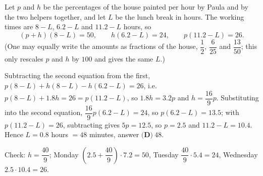 Let $p$ and $h$ be the percentages of the house painted per hour by Paula and by the two helpers together, and let $L$ be the lunch break in hours. The working times are $8-L$, $6.2-L$ and $11.2-L$ hours, so
\[
(p+h)(8-L)=50,\qquad h(6.2-L)=24,\qquad p(11.2-L)=26 .
\]
(One may equally write the amounts as fractions of the house, $\dfrac{1}{2}$, $\dfrac{6}{25}$ and $\dfrac{13}{50}$; this only rescales $p$ and $h$ by $100$ and gives the same $L$.)

Subtracting the second equation from the first, $p(8-L)+h(8-L)-h(6.2-L)=26$, i.e.\ $p(8-L)+1.8h=26=p(11.2-L)$, so $1.8h=3.2p$ and $h=\dfrac{16}{9}p$. Substituting into the second equation, $\dfrac{16}{9}p(6.2-L)=24$, so $p(6.2-L)=13.5$; with $p(11.2-L)=26$, subtracting gives $5p=12.5$, so $p=2.5$ and $11.2-L=10.4$. Hence $L=0.8$ hours $=48$ minutes, answer $\boxed{\textbf{(D)}\ 48}$.

Check: $h=\dfrac{40}{9}$; Monday $\left(2.5+\dfrac{40}{9}\right)\cdot7.2=50$, Tuesday $\dfrac{40}{9}\cdot5.4=24$, Wednesday $2.5\cdot10.4=26$.
